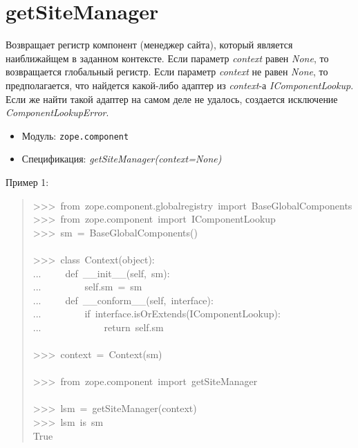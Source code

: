 \documentclass[14pt,a4paper,openany,twoside,final]{extbook}
\providecommand*{\DUroletitlereference}[1]{\textsl{#1}}
\begin{document}
\section*{getSiteManager%
  \label{getsitemanager}%
}

Возвращает регистр компонент (менеджер сайта), который является
наиближайщем в заданном контексте. Если параметр \DUroletitlereference{context} равен
\DUroletitlereference{None}, то возвращается глобальный регистр.  Если параметр
\DUroletitlereference{context} не равен \DUroletitlereference{None}, то предполагается, что найдется какой-либо
адаптер из \DUroletitlereference{context}-а \DUroletitlereference{IComponentLookup}.  Если же найти такой
адаптер на самом деле не удалось, создается исключение
\DUroletitlereference{ComponentLookupError}.

\begin{itemize}

\item Модуль: \texttt{zope.component}

\item Спецификация: \DUroletitlereference{getSiteManager(context=None)}

\end{itemize}

Пример 1:

\begin{quote}{\ttfamily \raggedright \noindent
>{}>{}>~from~zope.component.globalregistry~import~BaseGlobalComponents\\
>{}>{}>~from~zope.component~import~IComponentLookup\\
>{}>{}>~sm~=~BaseGlobalComponents()\\
~\\
>{}>{}>~class~Context(object):\\
...~~~~~def~\_\_init\_\_(self,~sm):\\
...~~~~~~~~~self.sm~=~sm\\
...~~~~~def~\_\_conform\_\_(self,~interface):\\
...~~~~~~~~~if~interface.isOrExtends(IComponentLookup):\\
...~~~~~~~~~~~~~return~self.sm\\
~\\
>{}>{}>~context~=~Context(sm)\\
~\\
>{}>{}>~from~zope.component~import~getSiteManager\\
~\\
>{}>{}>~lsm~=~getSiteManager(context)\\
>{}>{}>~lsm~is~sm\\
True
}
\end{quote}
\end{document}
